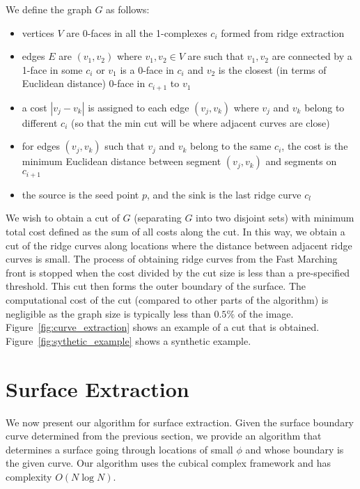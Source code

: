 \documentclass[10pt,journal,compsoc]{IEEEtran}
\begin{document}
We define the graph $G$ as follows:
\begin{itemize}
\item vertices $V$ are 0-faces in all the 1-complexes $c_i$ formed from ridge
  extraction 
\item edges $E$ are $(v_1,v_2)$ where $v_1, v_2\in V$ are such that
  $v_1, v_2$ are connected by a 1-face in some $c_i$ or $v_1$ is a
  0-face in $c_i$ and $v_2$ is the closest (in terms of Euclidean
  distance) 0-face in $c_{i+1}$ to $v_1$
\item a cost $|v_j-v_k|$ is assigned to each edge
  $(v_j,v_k)$ where $v_j$ and $v_k$ belong to different $c_i$ (so that
  the min cut will be where adjacent curves are close)
\item for edges $(v_j,v_k)$ such that $v_j$ and $v_k$ belong to the
  same $c_i$, the cost is the minimum Euclidean distance between
  segment $(v_j,v_k)$ and segments on $c_{i+1}$
\item the source is the seed point $p$, and the sink is the last ridge
  curve $c_l$
\end{itemize}

We wish to obtain a cut of $G$ (separating $G$ into two disjoint sets)
with minimum total cost defined as the sum of all costs along the
cut. In this way, we obtain a cut of the ridge curves along locations
where the distance between adjacent ridge curves is small. The process
of obtaining ridge curves from the Fast Marching front is stopped when
the cost divided by the cut size is less than a pre-specified
threshold. This cut then forms the outer boundary of the surface. The
computational cost of the cut (compared to other parts of the
algorithm) is negligible as the graph size is typically less than
$0.5\%$ of the image.  Figure~\ref{fig:curve_extraction} shows an
example of a cut that is obtained. Figure~\ref{fig:sythetic_example}
shows a synthetic example.



\section{Surface Extraction}

\label{subsec:surface_extraction}

We now present our algorithm for surface extraction.  Given the
surface boundary curve determined from the previous section, we
provide an algorithm that determines a surface going through locations
of small $\phi$ and whose boundary is the given curve. Our algorithm
uses the cubical complex framework and has complexity $O(N\log N)$.
\end{document}
